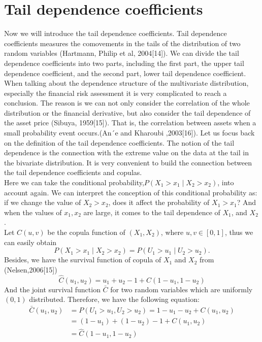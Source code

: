\documentclass[mstat,12pt]{unswthesis}  %
\numberwithin{equation}{section}
\begin{document}
\section{Tail dependence coefficients}
Now we will introduce the tail dependence coefficients. Tail dependence coefficients measures the comovements in the tails of the distribution of two random variables (Hartmann, Philip et al, 2004[14]). We can divide the tail dependence coefficients into two parts, including the first part, the upper tail dependence coefficient, and the second part, lower tail dependence coefficient. When talking about the dependence structure of the multivariate distribution, especially the financial risk assessment it is very complicated to reach a conclusion. The reason is we can not only consider the correlation of the whole distribution or the financial derivative, but also consider the tail dependence of the asset price (Sibuya, 1959[15]). That is, the correlation between assets when a small probability event occurs.(An´e and Kharoubi ,2003[16]). Let us focus back on the definition of the tail dependence coefficients. The notion of the tail dependence is the connection with the extreme value on the data at the tail in the bivariate distribution. It is very convenient to build the connection between the tail dependence coefficients and copulas. \\
Here we can take the conditional probability,$P\left(X_{1}>x_{1} \mid X_{2}>x_{2}\right)$, into account again. We can interpret the conception of this conditional probability as: if we change the value of $X_2 >x_2$, does it affect the probability of $X_1>x_1$? And when the values of $x_1, x_2$ are large, it comes to the tail dependence of $X_1$, and $X_2$.\\
Let $C(u,v)$ be the copula function of $(X_1,X_2)$, where $u,v \in [0,1]$, thus we can easily obtain
\begin{equation}
P\left(X_{1}>x_{1} \mid X_{2}>x_{2}\right)=P\left(U_{1}>u_{1} \mid U_{2}>u_{2}\right).
\end{equation}
Besides, we have the survival function of copula of $X_1$ and $X_2$ from (Nelsen,2006[15])
\begin{equation}
\hat{C}\left(u_{1}, u_{2}\right)=u_{1}+u_{2}-1+C\left(1-u_{1}, 1-u_{2}\right)
\end{equation}
And the joint survival function $\bar{C}$ for two random variables which are uniformly $(0,1)$ distributed. Therefore, we have the following equation:
\begin{equation}
\begin{split}
\bar{C}\left(u_{1}, u_{2}\right)&=P\left(U_{1}>u_{1}, U_{2}>u_{2}\right)=1-u_{1}-u_{2}+C\left(u_1, u_{2}\right)\\
& = (1-u_1)+(1-u_2)-1+C(u_1,u_2)\\
& = \hat{C}(1-u_1, 1-u_2)
\end{split}
\end{equation}
\end{document}
